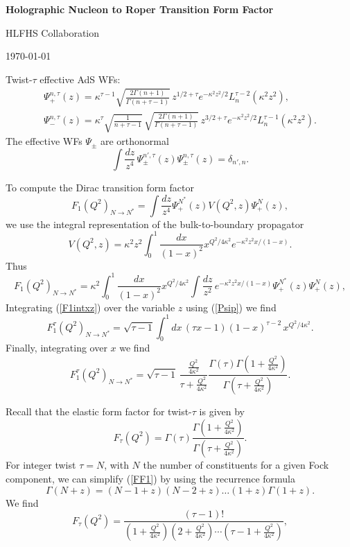 \documentclass[12pt]{article}
\newcommand{\beq}{\begin{equation}}
\newcommand{\enq}{\end{equation}}
\newcommand{\beqa}{\begin{eqnarray}}
\newcommand{\enqa}{\end{eqnarray}}
\newcommand{\req}[1]{(\ref{#1})}
\newcommand{\de}{\delta}
\newcommand{\ka}{\kappa}
\newcommand{\ta}{\tau}
\newcommand{\Ga}{\Gamma}
\begin{document}
\centerline{\large \bf Holographic Nucleon to Roper Transition Form Factor}

\vspace{10pt}

\centerline{HLFHS Collaboration}

\vspace{10pt}

\centerline{\today}

\vspace{20pt}


Twist-$\ta$ effective AdS WFs:
\beqa
\Psi_+^{n,\ta}(z) = \ka^{\ta -1} \sqrt{\frac{2 \Ga(n+1)}{\Ga(n + \tau - 1)}} \, z^{1/2 + \ta}
e^{- \ka^2 z^2/2}  L_n^{\ta -2}(\ka^2 z^2), \label{Psip}\\
\Psi_-^{n, \ta}(z) = \ka^\ta \sqrt{\frac{1}{n + \tau - 1}} \, \sqrt{\frac{2 \Ga(n+1)}{\Ga(n + \tau - 1)}} \, z^{3/2 + \ta}
e^{- \ka^2 z^2/2} L_n^{\ta -1}(\ka^2 z^2). \label{Psim}
\enqa
The effective WFs $\Psi_\pm$ are orthonormal
\beq
\int \frac{dz}{z^4} \, \Psi_\pm^{n', \ta}(z)  \Psi_\pm^{n, \ta}(z) = \de_{n',n}.
\enq



To compute the Dirac transition form factor 
\beq
F_1(Q^2)_{N \to N^*} = \int  \frac{dz}{z^4} \Psi_+^{N^*}(z) V(Q^2,z) \Psi_+^{N}(z),
\enq
we use the integral representation of the bulk-to-boundary propagator~\cite{Grigoryan:2007my}
\beq
V(Q^2,z) = \ka^2 z^2 \int_0^1 \frac{dx}{(1-x)^2} x^{Q^2/ 4 \ka^2} e^{- \ka^2 z^2 x /(1-x)}.
\enq
Thus
\beq
F_1(Q^2)_{N \to N^*} = \ka^2 \int_0^1 \frac{dx}{(1-x)^2} x^{Q^2/ 4 \ka^2} \int  \frac{dz}{z^2} \, e^{- \ka^2 z^2 x /(1-x)} 
\Psi_+^{N^*}(z)  \Psi_+^{N}(z), \label{F1intxz}
\enq
Integrating \req{F1intxz} over the variable $z$ using \req{Psip} we find
\beq
F_1^\ta(Q^2)_{N \to N^*} =  \sqrt{\tau - 1} \int_0^1 dx\, (\tau x - 1)  (1-x)^{\ta - 2}  \, x^{Q^2/ 4 \ka^2} .
\enq
Finally, integrating over $x$ we find
\beq
F_1^\ta(Q^2)_{N \to N^*} = \sqrt{\tau - 1}   \, \frac{\frac{Q^2}{4 \ka^2}}{\ta + \frac{Q^2}{4 \ka^2}}
 \frac{ \Ga(\ta) \Ga\left(1\! + \! \frac{Q^2}{4 \ka^2}\right)}{\Ga\left(\tau \! + \! \frac{Q^2}{4 \ka^2}\right)}. \label{F1TFF}
\enq

Recall that the elastic form factor for twist-$\ta$ is given by~\cite{Brodsky:2007hb} 
\beq \label{FF1}
F_\ta(Q^2) = \Ga(\tau)  
\frac{\Ga\left(1\! + \! \frac{Q^2}{4 \ka^2}\right)}{\Ga\left(\tau \! + \! \frac{Q^2}{4 \ka^2}\right)}.
\enq
For integer twist $\ta = N$, with $N$ the number of constituents  for a given Fock component,  we can simplify \req{FF1} by using the recurrence formula
\begin{equation} 
\Gamma(N+z) = (N - 1 + z) (N - 2 + z) \dots (1 + z) \Gamma(1+z).
\end{equation}
We find
\beq  \label{Ftaukappa}
F_\tau(Q^2) = \frac{(\ta-1)!}{\left(1 + \!\frac{Q^2}{4 \kappa^2} \right) \!
 \left(2 + \! \frac{Q^2}{4 \kappa^2}  \right)  \! \cdots \!
       \left(\ta \! - \! 1 \! + \!  \frac{Q^2}{4 \kappa^2}  \right)}, 
\enq
\end{document}
